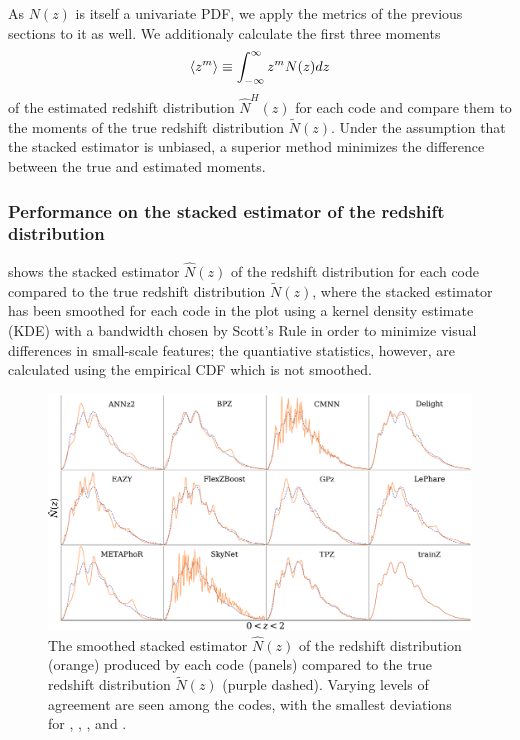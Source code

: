 As $N(z)$ is itself a univariate PDF, we apply the metrics of the previous sections to it as well.
We additionaly calculate the first three moments
\begin{equation}
\eqlabel{eq:moment}
\langle z^{m}\rangle \equiv \int_{-\infty}^{\infty} z^{m} N(z) dz
\end{equation}
of the estimated redshift distribution $\hat{N}^{H}(z)$ for each code and compare them to the moments of the true redshift distribution $\tilde{N}(z)$.
Under the assumption that the stacked estimator is unbiased, a superior method minimizes the difference between the true and estimated moments.

\subsubsection{Performance on the stacked estimator of the redshift distribution}
\label{sec:stackedmetrics_results}

 shows the stacked estimator $\hat{N}(z)$ of the redshift distribution for each code compared to the true redshift distribution $\tilde{N}(z)$, where the stacked estimator has been smoothed for each code in the plot using a kernel density estimate (KDE) with a bandwidth chosen by Scott's Rule \citep{scott_multivariate_1992} in order to minimize visual differences in small-scale features; the quantiative statistics, however, are calculated using the empirical CDF which is not smoothed.

\begin{figure}
	\centering
	\includegraphics[width=\textwidth]{figures/pzdc1/NZsumplot_AIM.pdf}
	\caption[The smoothed stacked estimator $\hat{N}(z)$ of the redshift distribution produced by each code considered in ]
	{The smoothed stacked estimator $\hat{N}(z)$ of the redshift distribution (orange) produced by each code (panels) compared to the true redshift distribution $\tilde{N}(z)$ (purple dashed).
		Varying levels of agreement are seen among the codes, with the smallest deviations for \cmnn, \flexzboost, \tpz, and \trainz.}
\end{figure}

